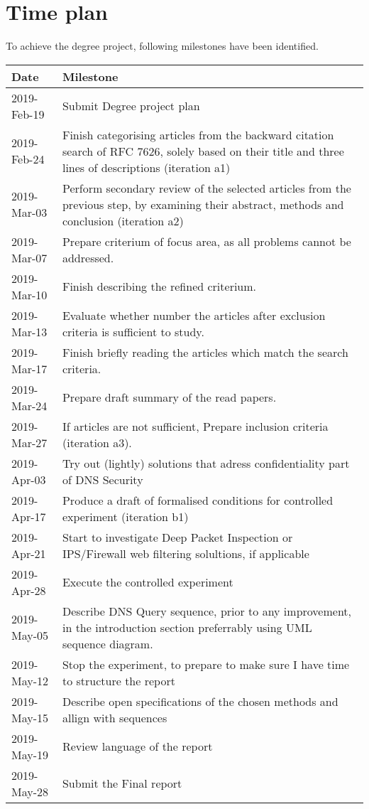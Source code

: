 \documentclass[a4paper,12pt]{article}
\begin{document}
\section*{Time plan}
To achieve the degree project, following milestones have been identified.
\\
\begin{tabular} {|p{2.6cm}|p{11.6cm}|} \hline
\textbf{Date} & \textbf{Milestone} \\ \hline
2019-Feb-19 & Submit Degree project plan \\ \hline
2019-Feb-24 & Finish categorising articles from the backward citation search of RFC 7626, solely based on their title and three lines of descriptions (iteration a1)\\ \hline
2019-Mar-03 & Perform secondary review of the selected articles from the previous step, by examining their abstract, methods and conclusion (iteration a2)\\ \hline
2019-Mar-07 & Prepare criterium of focus area, as all problems cannot be addressed. \\ \hline
2019-Mar-10 & Finish describing the refined criterium. \\ \hline
2019-Mar-13 & Evaluate whether number the articles after exclusion criteria is sufficient to study. \\ \hline
2019-Mar-17 & Finish briefly reading the articles which match the search criteria. \\ \hline
2019-Mar-24 & Prepare draft summary of the read papers. \\ \hline
2019-Mar-27 & If articles are not sufficient, Prepare inclusion criteria (iteration a3). \\ \hline
2019-Apr-03 & Try out (lightly) solutions that adress confidentiality part of DNS Security\\ \hline
2019-Apr-17 & Produce a draft of formalised conditions for controlled experiment (iteration b1)\\ \hline
2019-Apr-21 & Start to investigate Deep Packet Inspection or IPS/Firewall web filtering solultions, if applicable\\ \hline
2019-Apr-28 & Execute the controlled experiment\\ \hline
2019-May-05 & Describe DNS Query sequence, prior to any improvement, in the introduction section preferrably using UML sequence diagram.\\ \hline
2019-May-12 & Stop the experiment, to prepare to make sure I have time to structure the report\\ \hline
2019-May-15 & Describe open specifications of the chosen methods and allign with sequences\\ \hline
2019-May-19 & Review language of the report\\ \hline
2019-May-28 & Submit the Final report\\ \hline
\end{tabular}
\newpage


\end{document}
